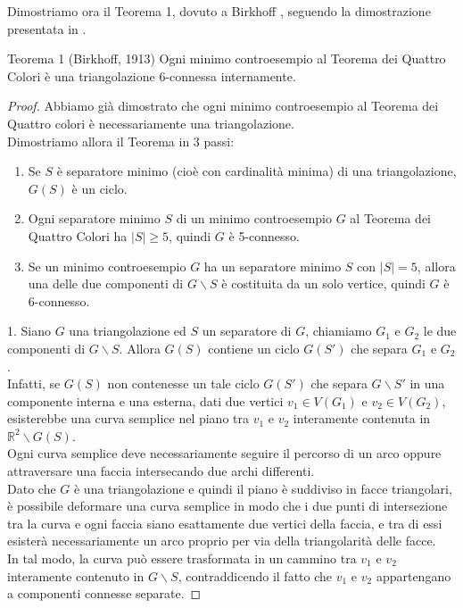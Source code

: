 \documentclass[a4paper,12pt,titlepage]{report}
\begin{document}
    Dimostriamo ora il Teorema 1, dovuto a Birkhoff {\bfseries \cite{Birkhoff}}, seguendo la dimostrazione presentata in {\bfseries \cite{Saaty}}.
    \begin{namedthm*}{Teorema 1 (Birkhoff, 1913)}
    	Ogni minimo controesempio al Teorema dei Quattro Colori è una triangolazione 6-connessa internamente.
    \end{namedthm*}
    \begin{proof}
    	Abbiamo già dimostrato che ogni minimo controesempio al Teorema dei Quattro colori è necessariamente una triangolazione.
    	\\Dimostriamo allora il Teorema in 3 passi:
    	\begin{enumerate}
    		\item Se $S$ è separatore minimo (cioè con cardinalità minima) di una triangolazione, $G(S)$ è un ciclo.
    		\item Ogni separatore minimo $S$ di un minimo controesempio $G$ al Teorema dei Quattro Colori ha $\lvert S \rvert \geq 5$, quindi $G$ è 5-connesso.
    		\item Se un minimo controesempio $G$ ha un separatore minimo $S$ con $\lvert S \rvert = 5$, allora una delle due componenti di $G \smallsetminus S$ è costituita da un solo vertice, quindi $G$ è 6-connesso.
    	\end{enumerate}
    	1. Siano $G$ una triangolazione ed $S$ un separatore di $G$, chiamiamo $G_1$ e $G_2$ le due componenti di $G \smallsetminus S$. Allora $G(S)$ contiene un ciclo $G(S')$ che separa $G_1$ e $G_2$.
    	\\Infatti, se $G(S)$ non contenesse un tale ciclo $G(S')$ che separa $G \smallsetminus S'$ in una componente interna e una esterna, dati due vertici $v_1 \in V(G_1)$ e $v_2 \in V(G_2)$, esisterebbe una curva semplice nel piano tra $v_1$ e $v_2$ interamente contenuta in $\mathbb{R}^2 \smallsetminus G(S)$.
    	\\Ogni curva semplice deve necessariamente seguire il percorso di un arco oppure attraversare una faccia intersecando due archi differenti.
    	\\Dato che $G$ è una triangolazione e quindi il piano è suddiviso in facce triangolari, è possibile deformare una curva semplice in modo che i due punti di intersezione tra la curva e ogni faccia siano esattamente due vertici della faccia, e tra di essi esisterà necessariamente un arco proprio per via della triangolarità delle facce.
    	\\In tal modo, la curva può essere trasformata in un cammino tra $v_1$ e $v_2$ interamente contenuto in $G \smallsetminus S$, contraddicendo il fatto che $v_1$ e $v_2$ appartengano a componenti connesse separate.

\end{proof}
\end{document}
